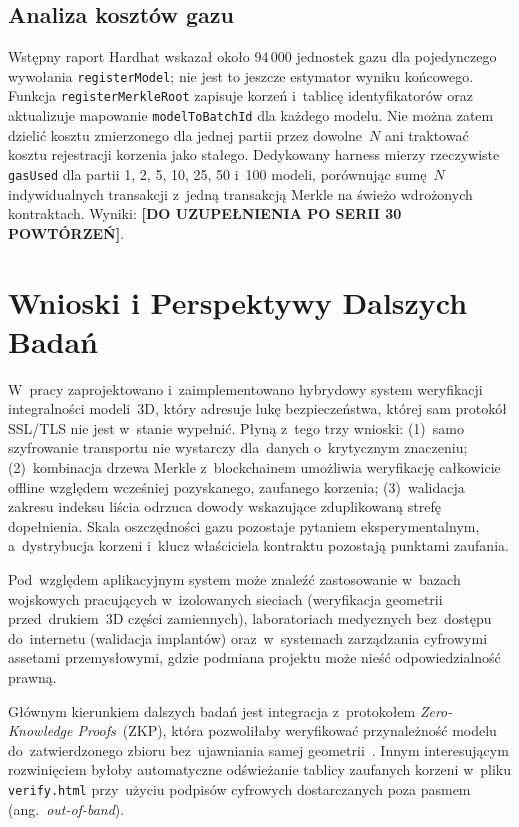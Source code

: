 \documentclass[10pt,conference,a4paper]{IEEEtran}
\begin{document}
\subsection{Analiza kosztów gazu}

Wstępny raport Hardhat wskazał około 94\,000 jednostek gazu
dla pojedynczego wywołania \texttt{registerModel}; nie jest to
jeszcze estymator wyniku końcowego. Funkcja
\texttt{registerMerkleRoot} zapisuje korzeń i~tablicę
identyfikatorów oraz aktualizuje mapowanie
\texttt{modelToBatchId} dla każdego modelu. Nie można zatem
dzielić kosztu zmierzonego dla jednej partii przez dowolne~$N$
ani traktować kosztu rejestracji korzenia jako stałego.
Dedykowany harness
mierzy rzeczywiste \texttt{gasUsed} dla partii 1, 2, 5, 10,
25, 50 i~100 modeli, porównując sumę~$N$ indywidualnych
transakcji z~jedną transakcją Merkle na świeżo wdrożonych
kontraktach. Wyniki: \textbf{[DO UZUPEŁNIENIA PO SERII 30
POWTÓRZEŃ]}.

\section{Wnioski i Perspektywy Dalszych Badań}

W~pracy zaprojektowano i~zaimplementowano hybrydowy system
weryfikacji integralności modeli~3D, który adresuje lukę
bezpieczeństwa, której sam protokół SSL/TLS nie jest
w~stanie wypełnić. Płyną z~tego trzy wnioski: (1)~samo
szyfrowanie transportu nie wystarczy dla~danych o~krytycznym
znaczeniu; (2)~kombinacja drzewa Merkle z~blockchainem
umożliwia weryfikację całkowicie offline względem wcześniej
pozyskanego, zaufanego korzenia; (3)~walidacja zakresu indeksu
liścia odrzuca dowody wskazujące zduplikowaną strefę
dopełnienia. Skala oszczędności gazu pozostaje pytaniem
eksperymentalnym, a~dystrybucja korzeni i~klucz właściciela
kontraktu pozostają punktami zaufania.

Pod~względem aplikacyjnym system może znaleźć zastosowanie
w~bazach wojskowych pracujących w~izolowanych sieciach
(weryfikacja geometrii przed~drukiem~3D części zamiennych),
laboratoriach medycznych bez~dostępu do~internetu (walidacja
implantów) oraz~w~systemach zarządzania cyfrowymi assetami
przemysłowymi, gdzie podmiana projektu może nieść
odpowiedzialność prawną.

Głównym kierunkiem dalszych badań jest integracja
z~protokołem \textit{Zero-Knowledge Proofs}~(ZKP), która
pozwoliłaby weryfikować przynależność modelu do~zatwierdzonego
zbioru bez~ujawniania samej geometrii~\cite{boneh2023}.
Innym interesującym rozwinięciem byłoby automatyczne
odświeżanie tablicy zaufanych korzeni w~pliku
\texttt{verify.html} przy~użyciu podpisów cyfrowych
dostarczanych poza pasmem (ang.~\textit{out-of-band}).
\end{document}
